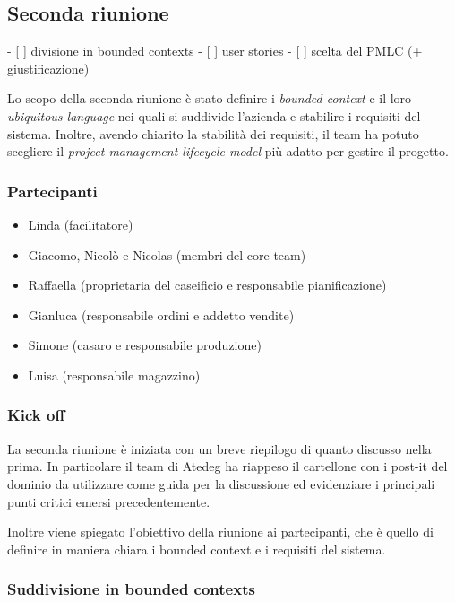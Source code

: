 \subsection{Seconda riunione}
\label{sec:seconda-riunione}

- [ ] divisione in bounded contexts
- [ ] user stories
- [ ] scelta del PMLC (+ giustificazione)

Lo scopo della seconda riunione è stato definire i \emph{bounded context} e il loro \emph{ubiquitous language} nei quali si suddivide l'azienda e stabilire i requisiti del sistema. Inoltre, avendo chiarito la stabilità dei requisiti, il team ha potuto scegliere il \emph{project management lifecycle model} più adatto per gestire il progetto.

\subsubsection{Partecipanti}
\label{sec:seconda-riunione-partecipanti}
\begin{itemize}
  \item Linda (facilitatore)
  \item Giacomo, Nicolò e Nicolas (membri del core team)
  \item Raffaella (proprietaria del caseificio e responsabile pianificazione)
  \item Gianluca (responsabile ordini e addetto vendite)
  \item Simone (casaro e responsabile produzione)
  \item Luisa (responsabile magazzino)
\end{itemize}

\subsubsection{Kick off}
\label{sec:seconda-riunione-kick-off}
La seconda riunione è iniziata con un breve riepilogo di quanto discusso nella prima.
In particolare il team di Atedeg ha riappeso il cartellone con i post-it del dominio da utilizzare come guida per la discussione ed evidenziare i principali punti critici emersi precedentemente.

Inoltre viene spiegato l'obiettivo della riunione ai partecipanti, che è quello di definire in maniera chiara i bounded context e i requisiti del sistema.

\subsubsection{Suddivisione in bounded contexts}
\label{sec:seconda-riunione-svolgimento}

